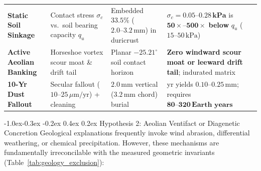 \documentclass[11pt,a4paper]{article}
\makeatletter
\renewcommand\subsection{\@startsection{subsection}{2}{\z@}%
                                     {-1.0ex\@plus -0.3ex \@minus -0.2ex}%
                                     {0.4ex \@plus 0.2ex}%
                                     {\normalfont\normalsize\bfseries}}
\makeatother
\begin{document}
\begin{table}[!ht]
\begin{tabular}{>{\raggedright\arraybackslash}p{2.75cm}>{\raggedright\arraybackslash}p{2.75cm}>{\raggedright\arraybackslash}p{3.05cm}>{\raggedright\arraybackslash}p{4.65cm}>{\centering\arraybackslash}p{1.2cm}}
\textbf{Static Soil Sinkage} & Contact stress $\sigma_c$ vs.\ soil bearing capacity $q_u$ & Embedded $33.5\%$ ($2.0\text{--}3.2\,\text{mm}$) in duricrust & $\sigma_c = \mathbf{0.05\text{--}0.28\,\text{kPa}}$ is $\mathbf{50\times\text{--}500\times}$ \textbf{below} $q_u$ ($15\text{--}50\,\text{kPa}$) & \cite{arvidson2014} \\
\textbf{Active Aeolian Banking} & Horseshoe vortex scour moat \& drift tail & Planar $-25.21^\circ$ soil contact horizon & \textbf{Zero windward scour moat or leeward drift tail}; indurated matrix & \cite{sullivan2022} \\
\textbf{10-Yr Dust Fallout} & Secular fallout ($10\text{--}25\,\mu\text{m/yr}$) + cleaning & $2.0\,\text{mm}$ vertical ($3.2\,\text{mm}$ chord) burial & 10 yr yields $0.10\text{--}0.25\,\text{mm}$; requires $\mathbf{80\text{--}320\,\text{Earth years}}$ & \cite{kinch2015,lorenz2021,vicente2018,vicente2023} \\
\bottomrule
\end{tabular}
\end{table}

\subsection{Hypothesis 2: Aeolian Ventifact or Diagenetic Concretion}
Geological explanations frequently invoke wind abrasion, differential weathering, or chemical precipitation. However, these mechanisms are fundamentally irreconcilable with the measured geometric invariants (Table~\ref{tab:geology_exclusion}):
\end{document}
